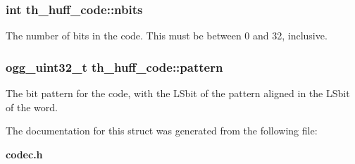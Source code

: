 \subsubsection[{nbits}]{\setlength{\rightskip}{0pt plus 5cm}int {\bf th\_\-huff\_\-code::nbits}}\label{structth__huff__code_aaf97b8f2f90042f7bc136a7b2bc35e35}


The number of bits in the code. This must be between 0 and 32, inclusive. 
\subsubsection[{pattern}]{\setlength{\rightskip}{0pt plus 5cm}ogg\_\-uint32\_\-t {\bf th\_\-huff\_\-code::pattern}}\label{structth__huff__code_a6dd29e3aa5a0c5a2dd5ce1f45b1162b4}


The bit pattern for the code, with the LSbit of the pattern aligned in the LSbit of the word. 

The documentation for this struct was generated from the following file:\begin{DoxyCompactItemize}
\item 
{\bf codec.h}\end{DoxyCompactItemize}
